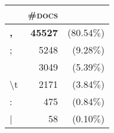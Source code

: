 \begin{tabular}{lrr} 
 \toprule 
 & \textsc{\#docs} & \\ 
 \midrule 
\textbf{,}&\textbf{45527 }&(80.54$\%$)\\ 
  ;&5248 &(9.28$\%$)\\ 
   &3049 &(5.39$\%$)\\ 
  \textbackslash t&2171 &(3.84$\%$)\\ 
  :&475 &(0.84$\%$)\\ 
  |&58 &(0.10$\%$)\\ 
  \bottomrule 
 \end{tabular}